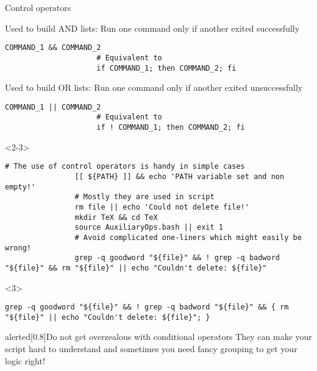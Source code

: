 \begin{frame}[fragile]{Control operators}
    \begin{overlayarea}{\textwidth}{0.56\textheight}
        \begin{description}[<only@1>][\texttt{\&\&}]
            \setlength{\itemsep}{5mm}
            \item[\texttt{\&\&}]
                 Used to build AND lists: Run one command only if another exited successfully
                 \begin{lstlisting}[style=MyBash, numbers=none, aboveskip=2mm]
                     COMMAND_1 && COMMAND_2
                     # Equivalent to
                     if COMMAND_1; then COMMAND_2; fi
                 \end{lstlisting}
            \item[\texttt{||}]
                 Used to build OR lists: Run one command only if another exited unsuccessfully
                 \begin{lstlisting}[style=MyBash, numbers=none, aboveskip=2mm]
                     COMMAND_1 || COMMAND_2
                     # Equivalent to
                     if ! COMMAND_1; then COMMAND_2; fi
                 \end{lstlisting}
        \end{description}
        \begin{onlyenv}<2-3>
            \begin{lstlisting}[style=MyBash, numbers=none, belowskip=-5mm]
                # The use of control operators is handy in simple cases
                [[ ${PATH} ]] && echo 'PATH variable set and non empty!'
                # Mostly they are used in script
                rm file || echo 'Could not delete file!'
                mkdir TeX && cd TeX
                source AuxiliaryOps.bash || exit 1
                # Avoid complicated one-liners which might easily be wrong!
                grep -q goodword "${file}" && ! grep -q badword "${file}" && rm "${file}" || echo "Couldn't delete: ${file}"
            \end{lstlisting}
            \centerline{\small{}}
            \begin{uncoverenv}<3>
                \begin{lstlisting}[style=MyBash, numbers=none, aboveskip=3mm]
                    grep -q goodword "${file}" && ! grep -q badword "${file}" && { rm "${file}" || echo "Couldn't delete: ${file}"; }
                \end{lstlisting}
            \end{uncoverenv}
        \end{onlyenv}
    \end{overlayarea}
    \begin{varblock}{alerted}[0.8\textwidth]{Do not get overzealous with conditional operators}
        They can make your script hard to understand and sometimes you need fancy grouping to get your logic right!
    \end{varblock}
\end{frame}
